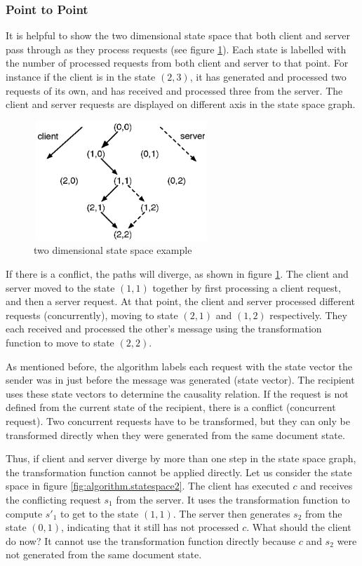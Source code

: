 \subsubsection{Point to Point}
It is helpful to show the two dimensional state space that both client and server pass through as they process requests (see figure \ref{fig:algorithm.statespace}). Each state is labelled with the number of processed requests from both client and server to that point. For instance if the client is in the state $(2,3)$, it has generated and processed two requests of its own, and has received and processed three from the server. The client and server requests are displayed on different axis in the state space graph.

\begin{figure}[htb]
 \centering
 \includegraphics[width=6.63cm,height=4.5cm]{../images/finalreport/algorithm_statespace.eps}
 \caption{two dimensional state space example}
 \label{fig:algorithm.statespace}
\end{figure}

If there is a conflict, the paths will diverge, as shown in figure 
\ref{fig:algorithm.statespace}. The client and server moved to the state $(1,1)$ 
together by first processing a client request, and then a server request. At 
that point, the client and server processed different requests (concurrently), 
moving to state $(2,1)$ and $(1,2)$ respectively. They each received and 
processed the other's message using the transformation function to move to state 
$(2,2)$.

As mentioned before, the algorithm labels each request with the state vector the
sender was in just before the message was generated (state vector). The 
recipient uses these state vectors to determine the causality relation.
If the request is not defined from the current state of the 
recipient, there is a conflict (concurrent request). Two concurrent requests 
have to be transformed, but they can only be transformed directly when they were 
generated from the same document state.

Thus, if client and server diverge by more than one step in the state space 
graph, the transformation function cannot be applied directly. Let us consider 
the state space in figure \ref{fig:algorithm.statespace2}. The client has 
executed $c$ and receives the conflicting request $s_1$ from the server. It uses 
the transformation function to compute $s'_1$ to get to the state $(1,1)$. The 
server then generates $s_2$ from the state $(0,1)$, indicating that it still has 
not processed $c$. What should the client do now? It cannot use the 
transformation function directly because $c$ and $s_2$ were not generated from 
the same document state.

